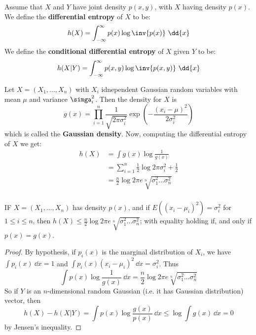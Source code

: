 \begin{definition}
    Assume that $X$ and  $Y$ have joint density  $p(x,y)$, with $X$ having
    density  $p(x)$. We define the \textbf{differential entropy} of $X$ to be:
    \begin{equation}
        h(X)=\int_{-\infty}^{\infty}{p(x)\log{\inv{p(x)}}} \ \dd{x}
    \end{equation}
    We define the \textbf{conditional differential entropy} of $X$ given  $Y$ to
    be:
    \begin{equation}
        h(X|Y)=\int_{-\infty}^{\infty}{p(x,y)\log{\inv{p(x,y)}}} \ \dd{x}
    \end{equation}
\end{definition}

\begin{example}
    Let $X=(X_1, \dots, X_n)$ with $X_i$ idnependent Gaussian random variables
    with mean  $\mu$ and variance  $\simga_i^2$. Then the density for  $X$ is
    \begin{equation}
        g(x)=\prod_{i=1}^n{\frac{1}{\sqrt{2\pi\sigma_i^2}}}
        \exp(-\frac{(x_i-\mu)^2}{2\sigma_i^2})
    \end{equation}
    which is called the \textbf{Gaussian density}. Now, computing the
    differential entropy of $X$ we get:
    \begin{align*}
        h(X)    &= \int{g(x)\log{\frac{1}{g(x)}}} \\
                &= \sum_{i=1}^n{\frac{1}{2}\log{2\pi\sigma_i^2}+\frac{1}{2}} \\
                &=\frac{n}{2}\log{2\pi e\sqrt[n]{\sigma_1^2 \dots \sigma_n^2}} \\
    \end{align*}
\end{example}

\begin{theorem}\label{2.3.3}
    IF $X=(X_1, \dots, X_n)$ has density $p(x)$, and if
    $E((x_i-\mu_i)^2)=\sigma_i^2$ for $1 \leq i \leq n$, then $h(X) \leq
    \frac{n}{2}\log{2\pi e\sqrt[n]{\sigma_1^2 \dots \sigma_n^2}}$; with equality
    holding if, and only if $p(x)=g(x)$.
\end{theorem}
\begin{proof}
    By hypothesis, if $p_i(x)$ is the marginal distribution of $X_i$, we have
    $\int{p_i(x)} \ \dd{x}=1$ and $\int{p_i(x)(x_i-\mu_i)^2} \
    \dd{x}=\sigma_i^2$. Thus
    \begin{equation*}
        \int{p(x)\log{\frac{1}{g(x)}}} \ \dd{x}=
        \frac{n}{2}\log{2\pi e\sqrt[n]{\sigma_1^2 \dots \sigma_n^2}}
    \end{equation*}
    So if $Y$ is an  $n$-dimensional random Gaussian  (i.e. it has Gaussian
    distribution) vector, then
    \begin{equation*}
        h(X)-h(X|Y)=\int{p(x)\log{\frac{g(x)}{p(x)}}} \ \dd{x} \leq
        \log{\int{g(x)} \ \dd{x}}=0
    \end{equation*}
    by Jensen's inequality.
\end{proof}

